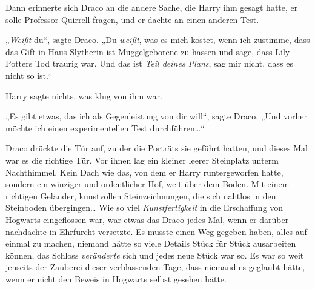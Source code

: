 Dann erinnerte sich Draco an die andere Sache, die Harry ihm gesagt hatte, er solle Professor Quirrell fragen, und er dachte an einen anderen Test.

„\emph{Weißt} du“, sagte Draco. „Du \emph{weißt}, was es mich kostet, wenn ich zustimme, dass das Gift in Haus Slytherin ist Muggelgeborene zu hassen und sage, dass Lily Potters Tod traurig war. Und das ist \emph{Teil deines Plans}, sag mir nicht, dass es nicht so ist.“

Harry sagte nichts, was klug von ihm war.

„Es gibt etwas, das ich als Gegenleistung von dir will“, sagte Draco. „Und vorher möchte ich einen experimentellen Test durchführen…“

\later

Draco drückte die Tür auf, zu der die Porträts sie geführt hatten, und dieses Mal war es die richtige Tür. Vor ihnen lag ein kleiner leerer Steinplatz unterm Nachthimmel. Kein Dach wie das, von dem er Harry runtergeworfen hatte, sondern ein winziger und ordentlicher Hof, weit über dem Boden. Mit einem richtigen Geländer, kunstvollen Steinzeichnungen, die sich nahtlos in den Steinboden übergingen… Wie so viel \emph{Kunstfertigkeit} in die Erschaffung von Hogwarts eingeflossen war, war etwas das Draco jedes Mal, wenn er darüber nachdachte in Ehrfurcht versetzte. Es musste einen Weg gegeben haben, alles auf einmal zu machen, niemand hätte so viele Details Stück für Stück ausarbeiten können, das Schloss \emph{veränderte} sich und jedes neue Stück war so. Es war so weit jenseits der Zauberei dieser verblassenden Tage, dass niemand es geglaubt hätte, wenn er nicht den Beweis in Hogwarts selbst gesehen hätte.

